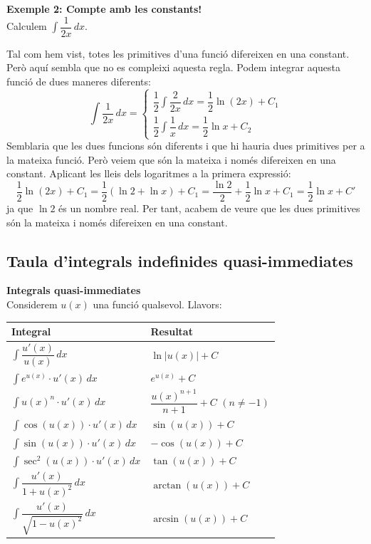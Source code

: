 \documentclass[12pt]{article}
\begin{document}
\begin{exemple}
\textbf{Exemple 2: Compte amb les constants!}\\
Calculem $\displaystyle \int \dfrac{1}{2x}\,dx$.

Tal com hem vist, totes les primitives d'una funció difereixen en una constant. Però aquí sembla que no es compleixi aquesta regla. Podem integrar aquesta funció de dues maneres diferents:
\[
\int \dfrac{1}{2x}\,dx =
\begin{cases}
\dfrac{1}{2}\displaystyle\int \dfrac{2}{2x}\,dx = \dfrac{1}{2}\ln(2x) + C_1 \\[0.3cm]
\dfrac{1}{2}\displaystyle\int \dfrac{1}{x}\,dx = \dfrac{1}{2}\ln x + C_2
\end{cases}
\]
Semblaria que les dues funcions són diferents i que hi hauria dues primitives per a la mateixa funció. Però veiem que són la mateixa i només difereixen en una constant. Aplicant les lleis dels logaritmes a la primera expressió:
\[
\dfrac{1}{2}\ln(2x)+C_1 = \dfrac{1}{2}(\ln 2 + \ln x)+C_1 = \dfrac{\ln 2}{2}+\dfrac{1}{2}\ln x+C_1 = \dfrac{1}{2}\ln x+C'
\]
ja que $\ln 2$ és un nombre real. Per tant, acabem de veure que les dues primitives són la mateixa i només difereixen en una constant.
\end{exemple}

\subsection{Taula d'integrals indefinides quasi-immediates}

\begin{concept}
\textbf{Integrals quasi-immediates}\\
Considerem $u(x)$ una funció qualsevol. Llavors:

\renewcommand{\arraystretch}{1.5}
\begin{center}
\begin{tabular}{|l|l|}
\hline
\textbf{Integral} & \textbf{Resultat} \\
\hline
$\displaystyle \int \dfrac{u'(x)}{u(x)}\,dx$ & $\ln|u(x)| + C$ \\
$\displaystyle \int e^{u(x)} \cdot u'(x)\,dx$ & $e^{u(x)} + C$ \\
$\displaystyle \int u(x)^n \cdot u'(x)\,dx$ & $\dfrac{u(x)^{n+1}}{n+1} + C$ \quad $(n\neq -1)$ \\
$\displaystyle \int \cos(u(x)) \cdot u'(x)\,dx$ & $\sin(u(x)) + C$ \\
$\displaystyle \int \sin(u(x)) \cdot u'(x)\,dx$ & $-\cos(u(x)) + C$ \\
$\displaystyle \int \sec^2(u(x)) \cdot u'(x)\,dx$ & $\tan(u(x)) + C$ \\
$\displaystyle \int \dfrac{u'(x)}{1+u(x)^2}\,dx$ & $\arctan(u(x)) + C$ \\
$\displaystyle \int \dfrac{u'(x)}{\sqrt{1-u(x)^2}}\,dx$ & $\arcsin(u(x)) + C$ \\
\hline
\end{tabular}
\end{center}
\end{concept}
\end{document}

